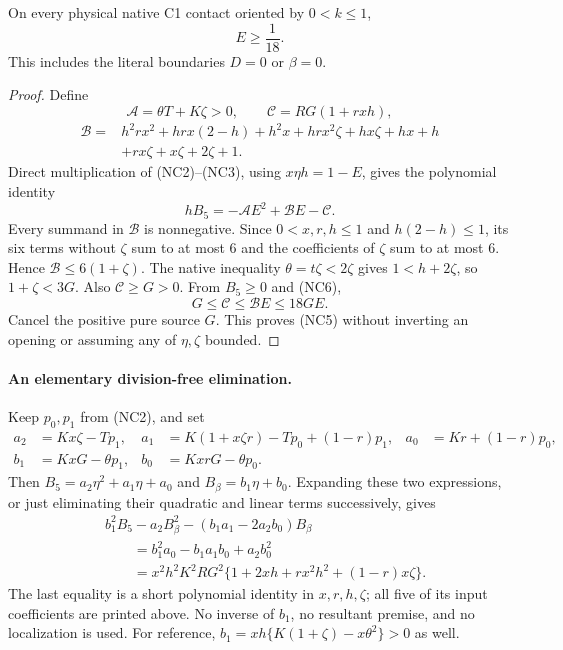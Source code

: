 \begin{lemma}
On every physical native C1 contact oriented by $0<k\le1$,
\[
                         E\ge\frac1{18}.             \tag{NC5}
\]
This includes the literal boundaries $D=0$ or $\beta=0$.
\end{lemma}
\begin{proof}
Define
\[
 \mathcal A=\theta T+K\zeta>0,\qquad
 \mathcal C=RG(1+rxh),
\]
\begin{align*}
 \mathcal B={}&h^2rx^2+hrx(2-h)+h^2x+hrx^2\zeta
             +hx\zeta+hx+h\\
             &+rx\zeta+x\zeta+2\zeta+1.
\end{align*}
Direct multiplication of (NC2)--(NC3), using $x\eta h=1-E$,
gives the polynomial identity
\[
                  hB_5=-\mathcal A E^2+\mathcal B E-\mathcal C.
 \tag{NC6}
\]
Every summand in $\mathcal B$ is nonnegative. Since
$0<x,r,h\le1$ and $h(2-h)\le1$, its six terms without $\zeta$
sum to at most $6$ and the coefficients of $\zeta$ sum to at most
$6$. Hence $\mathcal B\le6(1+\zeta)$. The native inequality
$\theta=t\zeta<2\zeta$ gives $1<h+2\zeta$, so
$1+\zeta<3G$. Also $\mathcal C\ge G>0$. From $B_5\ge0$ and
(NC6),
\[
 G\le\mathcal C\le\mathcal B E\le18GE.
\]
Cancel the positive pure source $G$. This proves (NC5) without
inverting an opening or assuming any of $\eta,\zeta$ bounded.
\end{proof}

\paragraph{An elementary division-free elimination.}
Keep $p_0,p_1$ from (NC2), and set
\begin{align*}
 a_2&=Kx\zeta-Tp_1,&
 a_1&=K(1+x\zeta r)-Tp_0+(1-r)p_1,&
 a_0&=Kr+(1-r)p_0,\\
 b_1&=KxG-\theta p_1,&
 b_0&=KxrG-\theta p_0.
\end{align*}
Then $B_5=a_2\eta^2+a_1\eta+a_0$ and
$B_\beta=b_1\eta+b_0$. Expanding these two expressions, or just
eliminating their quadratic and linear terms successively, gives
\begin{align*}
 &b_1^2B_5-a_2B_\beta^2-(b_1a_1-2a_2b_0)B_\beta\\
 &\qquad=b_1^2a_0-b_1a_1b_0+a_2b_0^2\\
 &\qquad=x^2h^2K^2RG^2
       \{1+2xh+rx^2h^2+(1-r)x\zeta\}.
 \tag{NC7}
\end{align*}
The last equality is a short polynomial identity in $x,r,h,\zeta$;
all five of its input coefficients are printed above. No inverse of
$b_1$, no resultant premise, and no localization is used. For reference,
$b_1=xh\{K(1+\zeta)-x\theta^2\}>0$ as well.

